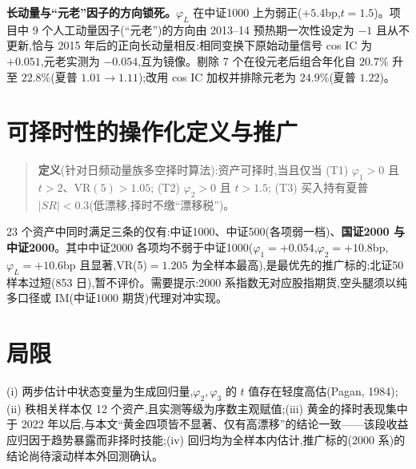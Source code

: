 \documentclass[11pt,a4paper,fontset=mac]{ctexart}
\begin{document}
\textbf{长动量与``元老''因子的方向锁死。}$\varphi_L$ 在中证1000 上为弱正($+5.4$bp,$t=1.5$)。项目中 9 个人工动量因子(``元老'')的方向由 2013--14 预热期一次性设定为 $-1$ 且从不更新,恰与 2015 年后的正向长动量相反:相同变换下原始动量信号 cos IC 为 $+0.051$,元老实测为 $-0.054$,互为镜像。剔除 7 个在役元老后组合年化自 $20.7\%$ 升至 $22.8\%$(夏普 $1.01\to1.11$);改用 cos IC 加权并排除元老为 $24.9\%$(夏普 $1.22$)。

\section{可择时性的操作化定义与推广}
\begin{quote}
\textbf{定义}(针对日频动量族多空择时算法):资产可择时,当且仅当
(T1) $\varphi_1>0$ 且 $t>2$、$\mathrm{VR}(5)>1.05$;
(T2) $\varphi_2>0$ 且 $t>1.5$;
(T3) 买入持有夏普 $|SR|<0.3$(低漂移,择时不缴``漂移税'')。
\end{quote}
23 个资产中同时满足三条的仅有:中证1000、中证500(各项弱一档)、\textbf{国证2000 与中证2000}。其中中证2000 各项均不弱于中证1000($\varphi_1=+0.054$,$\varphi_2=+10.8$bp,$\varphi_L=+10.6$bp 且显著,VR(5)$=1.205$ 为全样本最高),是最优先的推广标的;北证50 样本过短(853 日),暂不评价。需要提示:2000 系指数无对应股指期货,空头腿须以纯多口径或 IM(中证1000 期货)代理对冲实现。

\section{局限}
(i) 两步估计中状态变量为生成回归量,$\varphi_2,\varphi_3$ 的 $t$ 值存在轻度高估(Pagan, 1984);(ii) 秩相关样本仅 12 个资产,且实测等级为序数主观赋值;(iii) 黄金的择时表现集中于 2022 年以后,与本文``黄金四项皆不显著、仅有高漂移''的结论一致——该段收益应归因于趋势暴露而非择时技能;(iv) 回归均为全样本内估计,推广标的(2000 系)的结论尚待滚动样本外回测确认。
\end{document}
